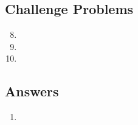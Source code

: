 \newpage
\subsection{Challenge Problems}

\begin{enumerate}\setcounter{enumi}{7}
\item %
\item %
\item %
\end{enumerate}


\newpage
\subsection{Answers}

\begin{enumerate}
\item 
\end{enumerate}